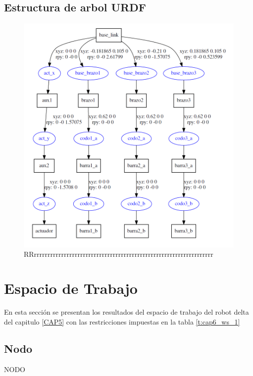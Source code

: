 \newpage

    \subsection{Estructura de arbol URDF}
    
        \begin{figure}[h]
            \centering
            \includegraphics[width=1.0\linewidth]{Main/Chapter7/Images7/rviz_1.png}
            \caption{RRrrrrrrrrrrrrrrrrrrrrrrrrrrrrrrrrrrrrrrrrrrrrrrrrrrrrrrrrrrrrrrrrrr}
            \label{f:cap7_rviz_1}
        \end{figure}  
    
\newpage


\section{Espacio de Trabajo}
        En esta sección se presentan los resultados del espacio de trabajo del robot delta del capitulo \ref{CAP5} con las restricciones impuestas en la tabla \ref{t:cap6_ws_1}
        
    \subsection{Nodo}
    NODO 
    
